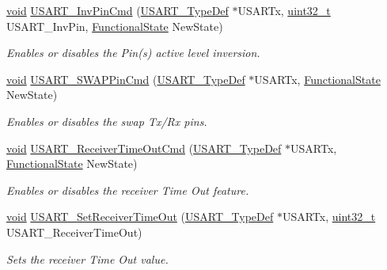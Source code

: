 \begin{DoxyCompactItemize}
\hyperlink{group___n_a_m_e_ga18028b8badbf1ea7e704ccac3c488e82}{void} \hyperlink{group___u_s_a_r_t___group1_gabbdf35d1d1061e337d7bdaa856767633}{U\-S\-A\-R\-T\-\_\-\-Inv\-Pin\-Cmd} (\hyperlink{struct_u_s_a_r_t___type_def}{U\-S\-A\-R\-T\-\_\-\-Type\-Def} $\ast$U\-S\-A\-R\-Tx, \hyperlink{stdint_8h_a435d1572bf3f880d55459d9805097f62}{uint32\-\_\-t} U\-S\-A\-R\-T\-\_\-\-Inv\-Pin, \hyperlink{group___exported__types_gac9a7e9a35d2513ec15c3b537aaa4fba1}{Functional\-State} New\-State)
\begin{DoxyCompactList}\small\item\em Enables or disables the Pin(s) active level inversion. \end{DoxyCompactList}\item 
\hyperlink{group___n_a_m_e_ga18028b8badbf1ea7e704ccac3c488e82}{void} \hyperlink{group___u_s_a_r_t___group1_gadced13bfe1e7d4f82c4c65a043d0e356}{U\-S\-A\-R\-T\-\_\-\-S\-W\-A\-P\-Pin\-Cmd} (\hyperlink{struct_u_s_a_r_t___type_def}{U\-S\-A\-R\-T\-\_\-\-Type\-Def} $\ast$U\-S\-A\-R\-Tx, \hyperlink{group___exported__types_gac9a7e9a35d2513ec15c3b537aaa4fba1}{Functional\-State} New\-State)
\begin{DoxyCompactList}\small\item\em Enables or disables the swap Tx/\-Rx pins. \end{DoxyCompactList}\item 
\hyperlink{group___n_a_m_e_ga18028b8badbf1ea7e704ccac3c488e82}{void} \hyperlink{group___u_s_a_r_t___group1_ga2961aad427f3c12c0475ccf12d382a61}{U\-S\-A\-R\-T\-\_\-\-Receiver\-Time\-Out\-Cmd} (\hyperlink{struct_u_s_a_r_t___type_def}{U\-S\-A\-R\-T\-\_\-\-Type\-Def} $\ast$U\-S\-A\-R\-Tx, \hyperlink{group___exported__types_gac9a7e9a35d2513ec15c3b537aaa4fba1}{Functional\-State} New\-State)
\begin{DoxyCompactList}\small\item\em Enables or disables the receiver Time Out feature. \end{DoxyCompactList}\item 
\hyperlink{group___n_a_m_e_ga18028b8badbf1ea7e704ccac3c488e82}{void} \hyperlink{group___u_s_a_r_t___group1_gaba906b8678c009a6f3413d2a66de45d1}{U\-S\-A\-R\-T\-\_\-\-Set\-Receiver\-Time\-Out} (\hyperlink{struct_u_s_a_r_t___type_def}{U\-S\-A\-R\-T\-\_\-\-Type\-Def} $\ast$U\-S\-A\-R\-Tx, \hyperlink{stdint_8h_a435d1572bf3f880d55459d9805097f62}{uint32\-\_\-t} U\-S\-A\-R\-T\-\_\-\-Receiver\-Time\-Out)
\begin{DoxyCompactList}\small\item\em Sets the receiver Time Out value. \end{DoxyCompactList}\item 

\end{DoxyCompactItemize}
